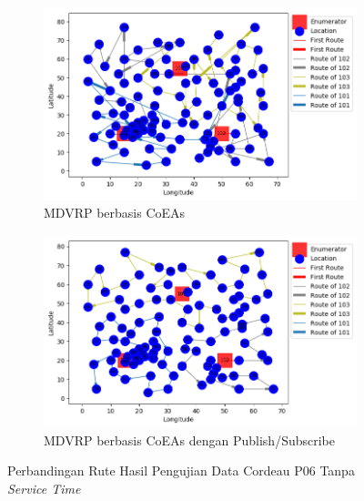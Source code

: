 \begin{figure}[!]
	\centering
	\begin{subfigure}[t]{\textwidth}
		\centering
		\includegraphics[width=\textwidth]{Resources/Images/test_result_cordeau_p06_notw_coes}
		\caption{MDVRP berbasis CoEAs}
		\label{fig:test_result_cordeau_p06_notw_coes}
	\end{subfigure}%
	
	\begin{subfigure}[t]{\textwidth}
		\centering
		\includegraphics[width=\textwidth]{Resources/Images/test_result_cordeau_p06_notw_pubsub_coes}
		\caption{MDVRP berbasis CoEAs dengan Publish/Subscribe}
		\label{fig:test_result_cordeau_p06_notw_pubsub_coes}
	\end{subfigure}
	\caption{Perbandingan Rute Hasil Pengujian Data Cordeau P06 Tanpa \textit{Service Time}}
	\label{fig:test_result_cordeau_p06_notw}
\end{figure}


